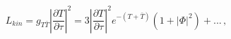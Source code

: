\begin{equation}
L_{kin} = g_{T \bar{T}} |\frac{\partial T}{\partial \tau}|^2 = 
3 |\frac{\partial T}{\partial \tau}|^2 e^{-(T + \bar{T})} (1+|\Phi|^2) + ... \, ,
\end{equation}

